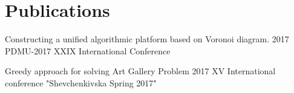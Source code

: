 \documentclass[letterpaper]{twentysecondcv} %
\begin{document}
\section{Publications}
\begin{twenty}
	\twentyitemwithoutbegin
    	{}
        {Constructing a unified algorithmic platform based on Voronoi diagram.}
        {2017}
        {PDMU-2017 XXIX International Conference}
        {}
        \end{twenty}
\begin{twenty}
	\twentyitemwithoutbegin
    	{}
        {Greedy approach for solving Art Gallery Problem}
        {2017}
        {XV International conference "Shevchenkivska Spring 2017"}
        {}
\end{twenty}
\end{document}
